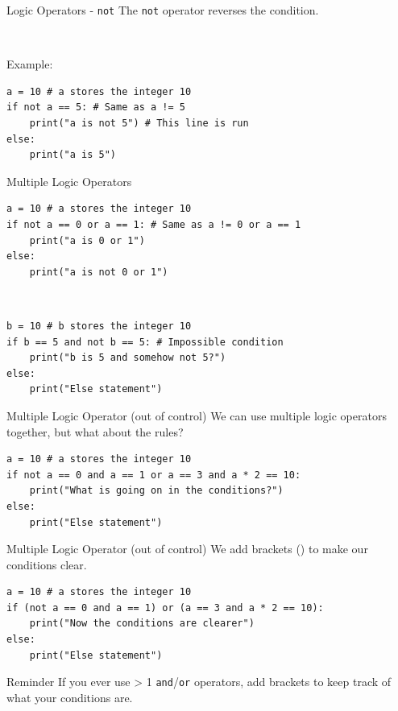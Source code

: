 \documentclass[dvipsnames, svgnames, x11names]{beamer}
\begin{document}
\begin{frame}[fragile]{Logic Operators - \texttt{not}}
The \texttt{not} operator reverses the condition.

\

Example:
\begin{verbatim}
a = 10 # a stores the integer 10
if not a == 5: # Same as a != 5
    print("a is not 5") # This line is run
else:
    print("a is 5")
\end{verbatim}
\end{frame}

\begin{frame}[fragile]{Multiple Logic Operators}
\begin{verbatim}
a = 10 # a stores the integer 10
if not a == 0 or a == 1: # Same as a != 0 or a == 1
    print("a is 0 or 1")
else:
    print("a is not 0 or 1")
\end{verbatim}

\

\begin{verbatim}
b = 10 # b stores the integer 10
if b == 5 and not b == 5: # Impossible condition
    print("b is 5 and somehow not 5?")
else:
    print("Else statement")
\end{verbatim}
\end{frame}

\begin{frame}[fragile]{Multiple Logic Operator (out of control)}
We can use multiple logic operators together, but what about the rules?
\begin{verbatim}
a = 10 # a stores the integer 10
if not a == 0 and a == 1 or a == 3 and a * 2 == 10:
    print("What is going on in the conditions?")
else:
    print("Else statement")
\end{verbatim}
\end{frame}

\begin{frame}[fragile]{Multiple Logic Operator (out of control)}
We add brackets () to make our conditions clear.
\begin{verbatim}
a = 10 # a stores the integer 10
if (not a == 0 and a == 1) or (a == 3 and a * 2 == 10):
    print("Now the conditions are clearer")
else:
    print("Else statement")
\end{verbatim}
\pause
\begin{block}{Reminder}
If you ever use > 1 \texttt{and}/\texttt{or} operators, add brackets to keep track of what your conditions are.
\end{block}
\end{frame}
\end{document}
